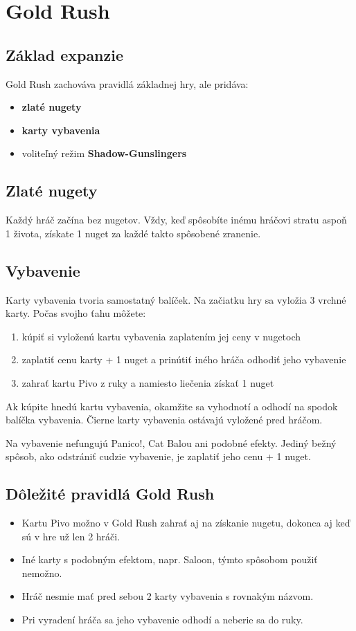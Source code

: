\chapter{Gold Rush}

\section*{Základ expanzie}
Gold Rush zachováva pravidlá základnej hry, ale pridáva:
\begin{itemize}
    \item \textbf{zlaté nugety}
    \item \textbf{karty vybavenia}
    \item voliteľný režim \textbf{Shadow-Gunslingers}
\end{itemize}

\section*{Zlaté nugety}
Každý hráč začína bez nugetov. Vždy, keď spôsobíte inému hráčovi stratu aspoň 1 života, získate 1 nuget za každé takto spôsobené zranenie.

\section*{Vybavenie}
Karty vybavenia tvoria samostatný balíček. Na začiatku hry sa vyložia 3 vrchné karty. Počas svojho ťahu môžete:
\begin{enumerate}
    \item kúpiť si vyloženú kartu vybavenia zaplatením jej ceny v nugetoch
    \item zaplatiť cenu karty + 1 nuget a prinútiť iného hráča odhodiť jeho vybavenie
    \item zahrať kartu Pivo z ruky a namiesto liečenia získať 1 nuget
\end{enumerate}

Ak kúpite hnedú kartu vybavenia, okamžite sa vyhodnotí a odhodí na spodok balíčka vybavenia. Čierne karty vybavenia ostávajú vyložené pred hráčom.

Na vybavenie nefungujú Panico!, Cat Balou ani podobné efekty. Jediný bežný spôsob, ako odstrániť cudzie vybavenie, je zaplatiť jeho cenu + 1 nuget.

\section*{Dôležité pravidlá Gold Rush}
\begin{itemize}
    \item Kartu Pivo možno v Gold Rush zahrať aj na získanie nugetu, dokonca aj keď sú v hre už len 2 hráči.
    \item Iné karty s podobným efektom, napr. Saloon, týmto spôsobom použiť nemožno.
    \item Hráč nesmie mať pred sebou 2 karty vybavenia s rovnakým názvom.
    \item Pri vyradení hráča sa jeho vybavenie odhodí a neberie sa do ruky.
\end{itemize}

